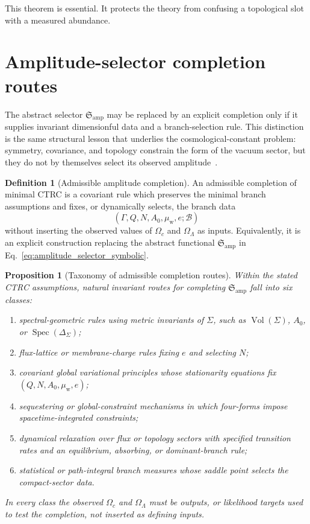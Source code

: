 \documentclass[
  aps,
  prd,
  reprint,
  superscriptaddress,
  floatfix,
  nofootinbib,
  longbibliography
]{revtex4-2}
\theoremstyle{plain}
\newtheorem{proposition}[theorem]{Proposition}
\theoremstyle{definition}
\newtheorem{definition}[theorem]{Definition}
\theoremstyle{remark}
\newcommand{\w}{\mathrm w}
\newcommand{\amp}{\mathrm{amp}}
\newcommand{\Vol}{\operatorname{Vol}}
\newcommand{\Spec}{\operatorname{Spec}}
\begin{document}
This theorem is essential.  It protects the theory from confusing a topological slot with a measured abundance.

\section{Amplitude-selector completion routes}

The abstract selector \(\mathfrak S_{\amp}\) may be replaced by an explicit
completion only if it supplies invariant dimensionful data and a branch-selection
rule.  This distinction is the same structural lesson that underlies the
cosmological-constant problem: symmetry, covariance, and topology constrain the
form of the vacuum sector, but they do not by themselves select its observed
amplitude~\cite{WeinbergCC}.

\begin{definition}[Admissible amplitude completion]
An admissible completion of minimal CTRC is a covariant rule which preserves the
minimal branch assumptions and fixes, or dynamically selects, the branch data
\begin{equation}
(\Gamma,Q,N,A_0,\mu_{\w},e;\mathcal B)
\end{equation}
without inserting the observed values of \(\Omega_c\) and \(\Omega_\Lambda\) as
inputs.  Equivalently, it is an explicit construction replacing the abstract
functional \(\mathfrak S_{\amp}\) in Eq.~\eqref{eq:amplitude_selector_symbolic}.
\end{definition}

\begin{proposition}[Taxonomy of admissible completion routes]
Within the stated CTRC assumptions, natural invariant routes for completing
\(\mathfrak S_{\amp}\) fall into six classes:
\begin{enumerate}
\item spectral-geometric rules using metric invariants of \(\Sigma\), such as
\(\Vol(\Sigma)\), \(A_0\), or \(\Spec(\Delta_\Sigma)\);
\item flux-lattice or membrane-charge rules fixing \(e\) and selecting \(N\);
\item covariant global variational principles whose stationarity equations fix
\((Q,N,A_0,\mu_{\w},e)\);
\item sequestering or global-constraint mechanisms in which four-forms impose
spacetime-integrated constraints;
\item dynamical relaxation over flux or topology sectors with specified
transition rates and an equilibrium, absorbing, or dominant-branch rule;
\item statistical or path-integral branch measures whose saddle point selects
the compact-sector data.
\end{enumerate}
In every class the observed \(\Omega_c\) and \(\Omega_\Lambda\) must be outputs,
or likelihood targets used to test the completion, not inserted as defining
inputs.
\end{proposition}
\end{document}
